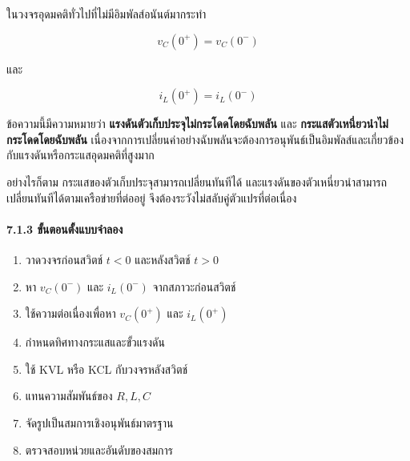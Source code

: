 ในวงจรอุดมคติทั่วไปที่ไม่มีอิมพัลส์อนันต์มากระทำ

\[
v_C(0^+)=v_C(0^-)
\]

และ

\[
i_L(0^+)=i_L(0^-)
\]

ข้อความนี้มีความหมายว่า \textbf{แรงดันตัวเก็บประจุไม่กระโดดโดยฉับพลัน} และ \textbf{กระแสตัวเหนี่ยวนำไม่กระโดดโดยฉับพลัน} เนื่องจากการเปลี่ยนค่าอย่างฉับพลันจะต้องการอนุพันธ์เป็นอิมพัลส์และเกี่ยวข้องกับแรงดันหรือกระแสอุดมคติที่สูงมาก

อย่างไรก็ตาม กระแสของตัวเก็บประจุสามารถเปลี่ยนทันทีได้ และแรงดันของตัวเหนี่ยวนำสามารถเปลี่ยนทันทีได้ตามเครือข่ายที่ต่ออยู่ จึงต้องระวังไม่สลับคู่ตัวแปรที่ต่อเนื่อง

\paragraph{7.1.3 ขั้นตอนตั้งแบบจำลอง}

\begin{enumerate}
    \item วาดวงจรก่อนสวิตช์ $t<0$ และหลังสวิตช์ $t>0$
    \item หา $v_C(0^-)$ และ $i_L(0^-)$ จากสภาวะก่อนสวิตช์
    \item ใช้ความต่อเนื่องเพื่อหา $v_C(0^+)$ และ $i_L(0^+)$
    \item กำหนดทิศทางกระแสและขั้วแรงดัน
    \item ใช้ KVL หรือ KCL กับวงจรหลังสวิตช์
    \item แทนความสัมพันธ์ของ $R,L,C$
    \item จัดรูปเป็นสมการเชิงอนุพันธ์มาตรฐาน
    \item ตรวจสอบหน่วยและอันดับของสมการ
\end{enumerate}


